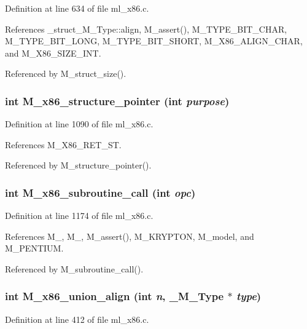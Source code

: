 Definition at line 634 of file ml\_\-x86.c.

References \_\-struct\_\-M\_\-Type::align, M\_\-assert(), M\_\-TYPE\_\-BIT\_\-CHAR, M\_\-TYPE\_\-BIT\_\-LONG, M\_\-TYPE\_\-BIT\_\-SHORT, M\_\-X86\_\-ALIGN\_\-CHAR, and M\_\-X86\_\-SIZE\_\-INT.

Referenced by M\_\-struct\_\-size().
\subsubsection{\setlength{\rightskip}{0pt plus 5cm}int M\_\-x86\_\-structure\_\-pointer (int {\em purpose})}\label{ml__x86_8c_7789db024e285b66a3e23ec665f0cdee}




Definition at line 1090 of file ml\_\-x86.c.

References M\_\-X86\_\-RET\_\-ST.

Referenced by M\_\-structure\_\-pointer().
\subsubsection{\setlength{\rightskip}{0pt plus 5cm}int M\_\-x86\_\-subroutine\_\-call (int {\em opc})}\label{ml__x86_8c_c0e5d67004b9e6e46317dd4c96a18f6c}




Definition at line 1174 of file ml\_\-x86.c.

References M\_, M\_, M\_\-assert(), M\_\-KRYPTON, M\_\-model, and M\_\-PENTIUM.

Referenced by M\_\-subroutine\_\-call().
\subsubsection{\setlength{\rightskip}{0pt plus 5cm}int M\_\-x86\_\-union\_\-align (int {\em n}, \bf{\_\-M\_\-Type} $\ast$ {\em type})}\label{ml__x86_8c_a29fe0df7a6cf4f4740a60b272a2ba69}




Definition at line 412 of file ml\_\-x86.c.

